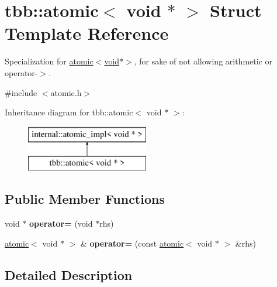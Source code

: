 \hypertarget{structtbb_1_1atomic_3_01void_01_5_01_4}{}\section{tbb\+:\+:atomic$<$ void $\ast$ $>$ Struct Template Reference}
\label{structtbb_1_1atomic_3_01void_01_5_01_4}


Specialization for \hyperlink{structtbb_1_1atomic_3_01void_01_5_01_4}{atomic$<$void$\ast$$>$}, for sake of not allowing arithmetic or operator-\/$>$.  




{\ttfamily \#include $<$atomic.\+h$>$}

Inheritance diagram for tbb\+:\+:atomic$<$ void $\ast$ $>$\+:\begin{figure}[H]
\begin{center}
\leavevmode
\includegraphics[height=2.000000cm]{structtbb_1_1atomic_3_01void_01_5_01_4}
\end{center}
\end{figure}
\subsection*{Public Member Functions}
\begin{DoxyCompactItemize}
\item 
\hypertarget{structtbb_1_1atomic_3_01void_01_5_01_4_a3da2906b224154d9961054f07b2e310b}{}void $\ast$ {\bfseries operator=} (void $\ast$rhs)\label{structtbb_1_1atomic_3_01void_01_5_01_4_a3da2906b224154d9961054f07b2e310b}

\item 
\hypertarget{structtbb_1_1atomic_3_01void_01_5_01_4_a8cb22d05fe655337f6129dc8f3ab6783}{}\hyperlink{structtbb_1_1atomic}{atomic}$<$ void $\ast$ $>$ \& {\bfseries operator=} (const \hyperlink{structtbb_1_1atomic}{atomic}$<$ void $\ast$ $>$ \&rhs)\label{structtbb_1_1atomic_3_01void_01_5_01_4_a8cb22d05fe655337f6129dc8f3ab6783}

\end{DoxyCompactItemize}


\subsection{Detailed Description}
